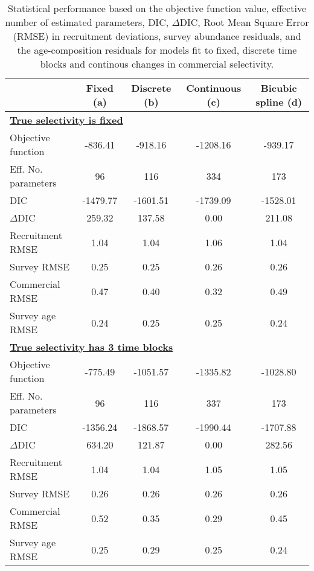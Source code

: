 \documentclass[review,letterpaper,10pt,authoryear]{elsarticle}
\begin{document}
\begin{table*}[!tbh]
	\caption{Statistical performance based on the objective function value, effective number of estimated parameters, DIC, $\Delta$DIC, Root Mean Square Error (RMSE) in recruitment deviations, survey abundance residuals, and the age-composition residuals for models fit to fixed, discrete time blocks and continous changes in commercial selectivity.}
	\label{tab:statisticalPeformance}
	\begin{center}
		\begin{tabular}{l|cccc}
		\hline

		\hline
		\textbf{} & \textbf{Fixed (a)} & \textbf{Discrete (b)} & \textbf{Continuous (c)} & \textbf{Bicubic spline (d)} \\
		\hline

		
	    \multicolumn{5}{l}{\textbf{\underline{True selectivity is fixed}}}\\
		Objective function            &  -836.41 &  -918.16 & -1208.16 &  -939.17 \\
		Eff. No. parameters             &    96 &   116 &   334 &   173 \\
		DIC              & -1479.77 & -1601.51 & -1739.09 & -1528.01 \\
		$\Delta$DIC         &   259.32 &   137.58 &     0.00 &   211.08 \\
		Recruitment RMSE &     1.04 &     1.04 &     1.06 &     1.04 \\
		Survey RMSE      &     0.25 &     0.25 &     0.26 &     0.26 \\
		Commercial RMSE         &     0.47 &     0.40 &     0.32 &     0.49 \\
		Survey age RMSE         &     0.24 &     0.25 &     0.25 &     0.24 \\
		
		\hline
		\multicolumn{5}{l}{\textbf{\underline{True selectivity has 3 time blocks}}}\\
		Objective function            &  -775.49 & -1051.57 & -1335.82 & -1028.80 \\
		Eff. No. parameters             &    96 &   116 &   337 &   173 \\
		DIC              & -1356.24 & -1868.57 & -1990.44 & -1707.88 \\
		$\Delta$DIC         &   634.20 &   121.87 &     0.00 &   282.56 \\
		Recruitment RMSE &     1.04 &     1.04 &     1.05 &     1.05 \\
		Survey RMSE      &     0.26 &     0.26 &     0.26 &     0.26 \\
		Commercial RMSE         &     0.52 &     0.35 &     0.29 &     0.45 \\
		Survey age RMSE         &     0.25 &     0.29 &     0.25 &     0.24 \\


\end{tabular}
\end{center}
\end{table*}
\end{document}
